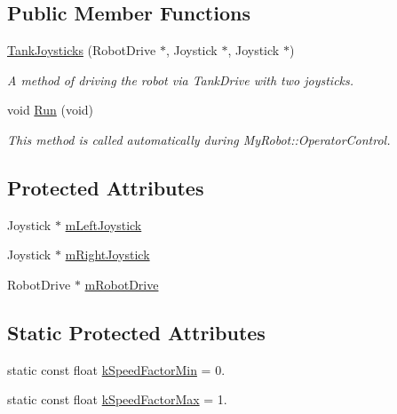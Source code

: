 \subsection*{\-Public \-Member \-Functions}
\begin{DoxyCompactItemize}
\item 
\hyperlink{class_tank_joysticks_aad06ac5bdf1e60252b16ec87ecb21ed7}{\-Tank\-Joysticks} (\-Robot\-Drive $\ast$, \-Joystick $\ast$, \-Joystick $\ast$)
\begin{DoxyCompactList}\small\item\em \-A method of driving the robot via \-Tank\-Drive with two joysticks. \end{DoxyCompactList}\item 
void \hyperlink{class_tank_joysticks_a77b5b392042169bb9cf2f67400870fb8}{\-Run} (void)
\begin{DoxyCompactList}\small\item\em \-This method is called automatically during \-My\-Robot\-::\-Operator\-Control. \end{DoxyCompactList}\end{DoxyCompactItemize}
\subsection*{\-Protected \-Attributes}
\begin{DoxyCompactItemize}
\item 
\-Joystick $\ast$ \hyperlink{class_tank_joysticks_a16401794f222fd934f5b86913a361a18}{m\-Left\-Joystick}
\item 
\-Joystick $\ast$ \hyperlink{class_tank_joysticks_ad393e41dbdcf3294e68336df1e85e56e}{m\-Right\-Joystick}
\item 
\-Robot\-Drive $\ast$ \hyperlink{class_tank_joysticks_a4536837c512d764f090bd7ea6b378a60}{m\-Robot\-Drive}
\end{DoxyCompactItemize}
\subsection*{\-Static \-Protected \-Attributes}
\begin{DoxyCompactItemize}
\item 
static const float \hyperlink{class_tank_joysticks_abdba3d773862b977177d157a99d48196}{k\-Speed\-Factor\-Min} = 0.
\item 
static const float \hyperlink{class_tank_joysticks_accc26be7603ec654301c9067920a070d}{k\-Speed\-Factor\-Max} = 1.
\end{DoxyCompactItemize}


